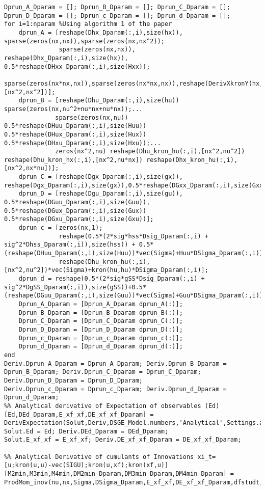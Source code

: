 \documentclass{article}
\begin{document}
\begin{verbatim}
Dprun_A_Dparam = []; Dprun_B_Dparam = []; Dprun_C_Dparam = []; Dprun_D_Dparam = []; Dprun_c_Dparam = []; Dprun_d_Dparam = [];
for i=1:nparam %Using algorithm 1 of the paper
    dprun_A = [reshape(Dhx_Dparam(:,i),size(hx)), sparse(zeros(nx,nx)),sparse(zeros(nx,nx^2));
               sparse(zeros(nx,nx)), reshape(Dhx_Dparam(:,i),size(hx)), 0.5*reshape(DHxx_Dparam(:,i),size(Hxx));
               sparse(zeros(nx*nx,nx)),sparse(zeros(nx*nx,nx)),reshape(DerivXkronY(hx,Dhx_Dparam(:,i),hx,Dhx_Dparam(:,i)),[nx^2,nx^2])];
    dprun_B = [reshape(Dhu_Dparam(:,i),size(hu)) sparse(zeros(nx,nu^2+nu*nx+nu*nx));...
              sparse(zeros(nx,nu)) 0.5*reshape(DHuu_Dparam(:,i),size(Huu)) 0.5*reshape(DHux_Dparam(:,i),size(Hux))  0.5*reshape(DHxu_Dparam(:,i),size(Hxu));...
              zeros(nx^2,nu) reshape(Dhu_kron_hu(:,i),[nx^2,nu^2]) reshape(Dhu_kron_hx(:,i),[nx^2,nu*nx]) reshape(Dhx_kron_hu(:,i),[nx^2,nx*nu])];
    dprun_C = [reshape(Dgx_Dparam(:,i),size(gx)), reshape(Dgx_Dparam(:,i),size(gx)),0.5*reshape(DGxx_Dparam(:,i),size(Gxx))];
    dprun_D = [reshape(Dgu_Dparam(:,i),size(gu)), 0.5*reshape(DGuu_Dparam(:,i),size(Guu)), 0.5*reshape(DGux_Dparam(:,i),size(Gux)) 0.5*reshape(DGxu_Dparam(:,i),size(Gxu))];
    dprun_c = [zeros(nx,1);
               reshape(0.5*(2*sig*hss*Dsig_Dparam(:,i) + sig^2*Dhss_Dparam(:,i)),size(hss)) + 0.5*(reshape(DHuu_Dparam(:,i),size(Huu))*vec(Sigma)+Huu*DSigma_Dparam(:,i));
               reshape(Dhu_kron_hu(:,i),[nx^2,nu^2])*vec(Sigma)+kron(hu,hu)*DSigma_Dparam(:,i)];
    dprun_d = reshape(0.5*(2*sig*gSS*Dsig_Dparam(:,i) + sig^2*DgSS_Dparam(:,i)),size(gSS))+0.5*(reshape(DGuu_Dparam(:,i),size(Guu))*vec(Sigma)+Guu*DSigma_Dparam(:,i));
    Dprun_A_Dparam = [Dprun_A_Dparam dprun_A(:)];
    Dprun_B_Dparam = [Dprun_B_Dparam dprun_B(:)];
    Dprun_C_Dparam = [Dprun_C_Dparam dprun_C(:)];
    Dprun_D_Dparam = [Dprun_D_Dparam dprun_D(:)];
    Dprun_c_Dparam = [Dprun_c_Dparam dprun_c(:)];
    Dprun_d_Dparam = [Dprun_d_Dparam dprun_d(:)];
end
Deriv.Dprun_A_Dparam = Dprun_A_Dparam; Deriv.Dprun_B_Dparam = Dprun_B_Dparam; Deriv.Dprun_C_Dparam = Dprun_C_Dparam; Deriv.Dprun_D_Dparam = Dprun_D_Dparam;
Deriv.Dprun_c_Dparam = Dprun_c_Dparam; Deriv.Dprun_d_Dparam = Dprun_d_Dparam;
%% Analytical derivative of Expectation of observables (Ed)
[Ed,DEd_Dparam,E_xf_xf,DE_xf_xf_Dparam] = DerivExpectation(Solut,Deriv,DSGE_Model.numbers,'Analytical',Settings.approx);
Solut.Ed = Ed; Deriv.DEd_Dparam = DEd_Dparam;
Solut.E_xf_xf = E_xf_xf; Deriv.DE_xf_xf_Dparam = DE_xf_xf_Dparam;

%% Analytical Derivative of cumulants of Innovations xi_t=[u;kron(u,u)-vec(SIGU);kron(u,xf);kron(xf,u)]
[M2min,M3min,M4min,DM2min_Dparam,DM3min_Dparam,DM4min_Dparam] = ProdMom_inov(nu,nx,Sigma,DSigma_Dparam,E_xf_xf,DE_xf_xf_Dparam,dfstudt,Ddfstudt_Dparam,DSGE_Model,Ident_Test,Settings);


\end{verbatim}
\end{document}
